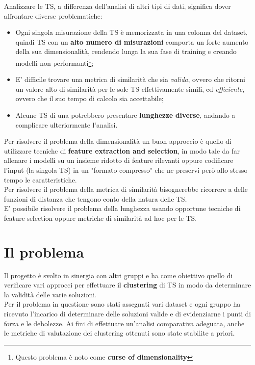 Analizzare le TS, a differenza dell'analisi di altri tipi di dati, significa dover affrontare diverse problematiche:
\begin{itemize}
	\item Ogni singola misurazione della TS è memorizzata in una colonna del dataset, quindi TS con un \textbf{alto numero di misurazioni} comporta un forte aumento della sua dimensionalità, rendendo lunga la sua fase di training e creando modelli non performanti\footnote{Questo problema è noto come \textbf{curse of dimensionality}};
	\item E' difficile trovare una metrica di similarità che sia \textit{valida}, ovvero che ritorni un valore alto di similarità per le sole TS effettivamente simili, ed \textit{efficiente}, ovvero che il suo tempo di calcolo sia accettabile;
	\item Alcune TS di una potrebbero presentare \textbf{lunghezze diverse}, andando a complicare ulteriormente l'analisi.
\end{itemize}
Per risolvere il problema della dimensionalità un buon approccio è quello di utilizzare tecniche di \textbf{feature extraction and selection}, in modo tale da far allenare i modelli su un insieme ridotto di feature rilevanti oppure codificare l'input (la singola TS) in un "formato compresso" che ne preservi però allo stesso tempo le caratteristiche.\\
Per risolvere il problema della metrica di similarità bisognerebbe ricorrere a delle funzioni di distanza che tengono conto della natura delle TS.\\
E' possibile risolvere il problema della lunghezza usando opportune tecniche di feature selection oppure metriche di similarità ad hoc per le TS.

\section{Il problema}
Il progetto è svolto in sinergia con altri gruppi e ha come obiettivo quello di verificare vari approcci per effettuare il \textbf{clustering} di TS  in modo da determinare la validità delle varie soluzioni.\\
Per il problema in questione sono stati assegnati vari dataset e ogni gruppo ha ricevuto l'incarico di determinare delle soluzioni valide e di evidenziarne i punti di forza e le debolezze. Ai fini di effettuare un'analisi comparativa adeguata, anche le metriche di valutazione dei clustering ottenuti sono state stabilite a priori.

